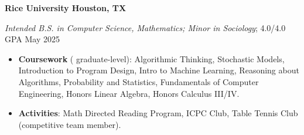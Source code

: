 \textbf{Rice University \hfill Houston, TX} \par
\textit{Intended B.S. in Computer Science, Mathematics; Minor in Sociology}; 4.0/4.0 GPA \hfill May 2025\par
\begin{itemize}
    \item \textbf{Coursework} (\textsuperscript{\textdagger} graduate-level): Algorithmic Thinking, Stochastic Models, Introduction to Program Design, Intro to Machine Learning\textsuperscript{\textdagger}, Reasoning about Algorithms, Probability and Statistics, Fundamentals of Computer Engineering, Honors Linear Algebra, Honors Calculus III/IV.
    \item \textbf{Activities}: Math Directed Reading Program, ICPC Club, Table Tennis Club (competitive team member).
\end{itemize}